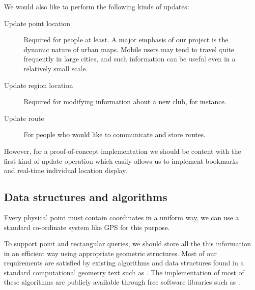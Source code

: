 \documentclass[a4paper,10pt]{article}
\begin{document}
We would also like to perform the following kinds of updates:
\begin{description}
\item[Update point location] Required for people at least. A major emphasis
  of our project is the dynamic nature of urban maps. Mobile users may tend
  to travel quite frequently in large cities, and such information can be
  useful even in a relatively small scale.
\item[Update region location] Required for modifying information about a new
  club, for instance.
\item[Update route] For people who would like to communicate and store
  routes.
\end{description}

However, for a proof-of-concept implementation we should be content with the
first kind of update operation which easily allows us to implement bookmarks
and real-time individual location display.

\subsection{Data structures and algorithms}

Every physical point must contain coordinates in a uniform way, we can use a
standard co-ordinate system like GPS for this purpose.

To support point and rectangular queries, we should store all the this
information in an efficient way using appropriate geometric structures. Most
of our requirements are satisfied by existing algorithms and data structures
found in a standard computational geometry text such as \cite{compgeom}. The
implementation of most of these algorithms are publicly available through free
software libraries such as \cite{cgal}. 
\end{document}
